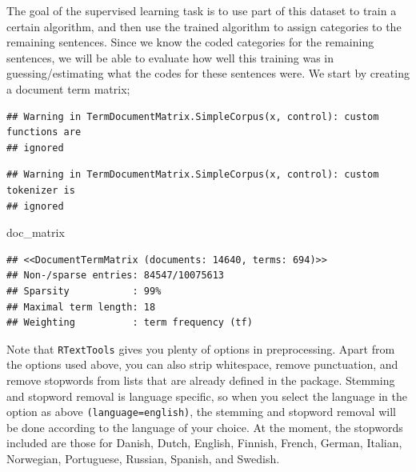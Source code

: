 \documentclass[
]{book}
\newenvironment{Shaded}{\begin{snugshade}}{\end{snugshade}}
\newcommand{\AttributeTok}[1]{\textcolor[rgb]{0.77,0.63,0.00}{#1}}
\newcommand{\ConstantTok}[1]{\textcolor[rgb]{0.00,0.00,0.00}{#1}}
\newcommand{\FloatTok}[1]{\textcolor[rgb]{0.00,0.00,0.81}{#1}}
\newcommand{\FunctionTok}[1]{\textcolor[rgb]{0.00,0.00,0.00}{#1}}
\newcommand{\NormalTok}[1]{#1}
\newcommand{\OtherTok}[1]{\textcolor[rgb]{0.56,0.35,0.01}{#1}}
\newcommand{\SpecialCharTok}[1]{\textcolor[rgb]{0.00,0.00,0.00}{#1}}
\newcommand{\StringTok}[1]{\textcolor[rgb]{0.31,0.60,0.02}{#1}}
\begin{document}
The goal of the supervised learning task is to use part of this dataset to train a certain algorithm, and then use the trained algorithm to assign categories to the remaining sentences. Since we know the coded categories for the remaining sentences, we will be able to evaluate how well this training was in guessing/estimating what the codes for these sentences were. We start by creating a document term matrix;

\begin{Shaded}
\end{Shaded}

\begin{verbatim}
## Warning in TermDocumentMatrix.SimpleCorpus(x, control): custom functions are
## ignored
\end{verbatim}

\begin{verbatim}
## Warning in TermDocumentMatrix.SimpleCorpus(x, control): custom tokenizer is
## ignored
\end{verbatim}

\begin{Shaded}
\begin{Highlighting}[]
\NormalTok{doc\_matrix}
\end{Highlighting}
\end{Shaded}

\begin{verbatim}
## <<DocumentTermMatrix (documents: 14640, terms: 694)>>
## Non-/sparse entries: 84547/10075613
## Sparsity           : 99%
## Maximal term length: 18
## Weighting          : term frequency (tf)
\end{verbatim}

Note that \texttt{RTextTools} gives you plenty of options in preprocessing. Apart from the options used above, you can also strip whitespace, remove punctuation, and remove stopwords from lists that are already defined in the package. Stemming and stopword removal is language specific, so when you select the language in the option as above \texttt{(language=\textquotesingle{}\textquotesingle{}english\textquotesingle{}\textquotesingle{})}, the stemming and stopword removal will be done according to the language of your choice. At the moment, the stopwords included are those for Danish, Dutch, English, Finnish, French, German, Italian, Norwegian, Portuguese, Russian, Spanish, and Swedish.
\end{document}
